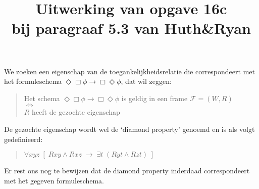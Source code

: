 \documentclass[a4paper,11pt]{article}
\title{Uitwerking van opgave 16c\\
\normalsize{bij paragraaf 5.3 van Huth\&Ryan}}
\date{}
\begin{document}
\maketitle


We zoeken een eigenschap van de toegankelijkheidsrelatie die correspondeert
met het formuleschema $\Diamond \Box \phi \rightarrow \Box \Diamond \phi$,
dat wil zeggen:

\begin{quote}
  Het schema $\Diamond \Box \phi \rightarrow \Box \Diamond \phi$ is geldig in
  een frame
  $\mathcal{F} = (W, R)$ \\
  $\Longleftrightarrow$ \\
  $R$ heeft de gezochte eigenschap
\end{quote}

De gezochte eigenschap wordt wel de `diamond property' genoemd en is als
volgt gedefinieerd:

\begin{quote}
  $\forall xyz \; [ \; Rxy \wedge Rxz \; \rightarrow \; \exists t \; ( Ryt \wedge Rzt ) \; ]$
\end{quote}

Er rest ons nog te bewijzen dat de diamond property inderdaad correspondeert
met het gegeven formuleschema.
\end{document}
